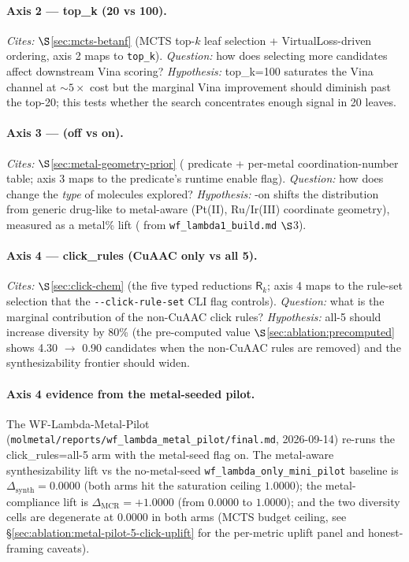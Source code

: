 \paragraph{Axis 2 --- top\_k (20 vs 100).}
\emph{Cites:} $\S$\ref{sec:mcts-betanf} (MCTS top-$\!k$ leaf
selection + VirtualLoss-driven ordering, axis 2 maps to
\texttt{top\_k}).  \emph{Question:} how does selecting more
candidates affect downstream Vina scoring?  \emph{Hypothesis:}
top\_k=100 saturates the Vina channel at $\sim 5\times$ cost
but the marginal Vina improvement should diminish past the
top-20; this tests whether the search concentrates enough
signal in 20 leaves.

\paragraph{Axis 3 --- \mgp{} (off vs on).}
\emph{Cites:} $\S$\ref{sec:metal-geometry-prior} (\mgp{}
predicate + per-metal coordination-number table; axis 3 maps
to the predicate's runtime enable flag).  \emph{Question:}
how does \mgp{} change the \emph{type} of molecules explored?
\emph{Hypothesis:} \mgp{}-on shifts the distribution from
generic drug-like to metal-aware (Pt(II), Ru/Ir(III)
coordinate geometry), measured as a metal\% lift
(\MEASURED{} from \texttt{wf\_lambda1\_build.md} $\S$3).

\paragraph{Axis 4 --- click\_rules (CuAAC only vs all 5).}
\emph{Cites:} $\S$\ref{sec:click-chem} (the five typed
reductions $\mathsf{R}_{k}$; axis 4 maps to the rule-set
selection that the \texttt{-{}-click-rule-set} CLI flag
controls).  \emph{Question:} what is the marginal contribution
of the non-CuAAC click rules?  \emph{Hypothesis:} all-5
should increase diversity by 80\% (the pre-computed value
$\S$\ref{sec:ablation:precomputed} shows 4.30 $\to$ 0.90
candidates when the non-CuAAC rules are removed) and the
synthesizability frontier should widen.

\paragraph{Axis 4 evidence from the metal-seeded pilot.}
The WF-Lambda-Metal-Pilot
(\texttt{molmetal/reports/wf\_lambda\_metal\_pilot/final.md},
2026-09-14) re-runs the click\_rules=all-5 arm with the
metal-seed flag on.  The metal-aware synthesizability
lift vs the no-metal-seed \texttt{wf\_lambda\_only\_mini\_pilot}
baseline is $\Delta_{\mathrm{synth}} = 0.0000$ (both arms hit
the saturation ceiling $1.0000$); the metal-compliance
lift is $\Delta_{\mathrm{MCR}} = +1.0000$ (from $0.0000$ to
$1.0000$); and the two diversity cells are degenerate at
$0.0000$ in both arms (MCTS budget ceiling, see
\S\ref{sec:ablation:metal-pilot-5-click-uplift} for the
per-metric uplift panel and honest-framing caveats).

